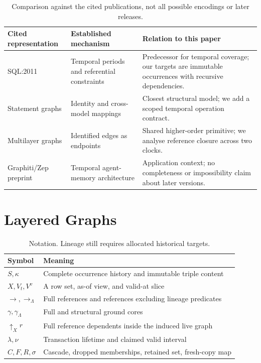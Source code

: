 \documentclass[11pt]{article}
\theoremstyle{plain}
\theoremstyle{definition}
\theoremstyle{remark}
\newcommand{\refs}{\rightarrow}          %
\newcommand{\dep}{{\uparrow}}            %
\newcommand{\core}{\gamma}               %
\newcommand{\life}{\lambda}              %
\newcommand{\valid}{\nu}                 %
\newcommand{\Lin}{\Lambda}               %
\begin{document}
\begin{table}[t]
\centering\small
\begin{tabular}{L{3.0cm}L{4.2cm}L{6.3cm}}
\toprule Cited representation & Established mechanism & Relation to this paper \\
\midrule
SQL:2011 \cite{kulkarni2012temporal} & Temporal periods and referential constraints & Predecessor for temporal coverage; our targets are immutable occurrences with recursive dependencies. \\
Statement graphs \cite{gelling2024statement} & Identity and cross-model mappings & Closest structural model; we add a scoped temporal operation contract. \\
Multilayer graphs \cite{angles2022multilayer} & Identified edges as endpoints & Shared higher-order primitive; we analyse reference closure across two clocks. \\
Graphiti/Zep preprint \cite{rasmussen2025zep} & Temporal agent-memory architecture & Application context; no completeness or impossibility claim about later versions. \\
\bottomrule
\end{tabular}
\caption{Comparison against the cited publications, not all possible encodings or later releases.}
\end{table}

\section{Layered Graphs}\label{sec:model}

\begin{table}[t]
\centering\small
\begin{tabular}{ll}
\toprule Symbol & Meaning \\
\midrule
$S,\kappa$ & Complete occurrence history and immutable triple content \\
$X,V_t,V^v$ & A row set, as-of view, and valid-at slice \\
$\refs,\refs_{\Lin}$ & Full references and references excluding lineage predicates \\
$\core,\core_{\Lin}$ & Full and structural ground cores \\
$\dep_X r$ & Full reference dependents inside the induced live graph \\
$\life,\valid$ & Transaction lifetime and claimed valid interval \\
$C,F,R,\sigma$ & Cascade, dropped memberships, retained set, fresh-copy map \\
\bottomrule
\end{tabular}
\caption{Notation. Lineage still requires allocated historical targets.}
\end{table}
\end{document}
